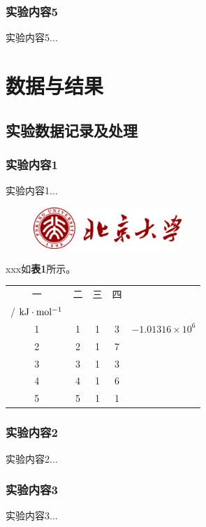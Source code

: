 \documentclass[12pt]{article}
\begin{document}
			\subsubsection{实验内容5}
			实验内容5...
    	
	\vbox{}  
	\section{数据与结果}
 		\subsection{实验数据记录及处理}
 		\subsubsection{实验内容1}
 		实验内容1...
 		
 		 \begin{figure}[h]
 			\centering
 			\includegraphics[width=0.5\textwidth]{pku.png}
 		\end{figure}
 	
 		xxx如\textbf{表1}所示。
 		
 		  \begin{table}[h]
 			\centering
 			\begin{tabular}{ccccc}
 				\toprule
 				一 & 二 & 三 & 四 & \thead[c] {$E_{trans}$ \\ / $ \rm kJ \cdot mol^{-1} $} \\
 				\midrule
 				1 & 1 & 1 & 3 & $-1.01316\times10^{6}$ \\
 				2 & 2 & 1 & 7 & \\
 				3 & 3 & 1 & 3 & \\
 				4 & 4 & 1 & 6 & \\
 				5 & 5 & 1 & 1 & \\
 				\bottomrule
 			\end{tabular}
 		\end{table}
 	\vbox{}
 		\subsubsection{实验内容2}
		实验内容2...
		\subsubsection{实验内容3}
		实验内容3...
\end{document}
